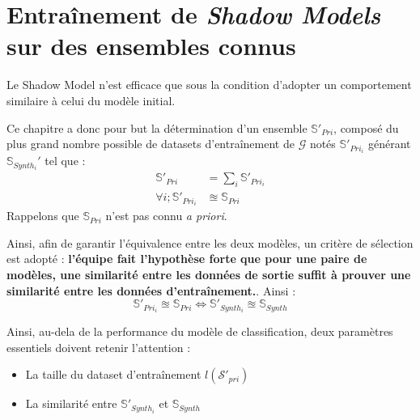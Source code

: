 \chapter{Entraînement de \textit{Shadow Models} sur des ensembles connus}\label{SM}
    Le Shadow Model n'est efficace que sous la condition d'adopter un comportement similaire à celui du modèle initial.

    Ce chapitre a donc pour but la détermination d'un ensemble $\mathbb{S}'_{Pri}$, composé du
    plus grand nombre possible de datasets d'entraînement de $\mathcal G$ notés $\mathbb{S}'_{Pri_i}$
    générant $\mathbb S_{Synth_i}'$ tel que :
                \begin{equation}\label{eq:Eq1}
                    \begin{split}
                        \mathbb{S}'_{Pri} &= \sum_i \mathbb{S}'_{Pri_i} \\
                        \forall i; \mathbb{S}'_{Pri_i} &\approxeq \mathbb{S}_{Pri}
                    \end{split}
                \end{equation}
    Rappelons que $\mathbb{S}_{Pri}$ n'est pas connu \textit{a priori}.

    Ainsi, afin de garantir l'équivalence entre les deux modèles, un critère de sélection est
    adopté :
    \textbf{l'équipe fait l'hypothèse forte que pour une paire de modèles, une similarité entre les données de sortie suffit à prouver une similarité entre les données d'entraînement.}. Ainsi :
        \begin{equation}\label{eq:Eq2}
            \mathbb{S}'_{Pri_i} \approxeq \mathbb{S}_{Pri} \Longleftrightarrow \mathbb{S}'_{Synth_i} \approxeq \mathbb{S}_{Synth}
        \end{equation}

    \begin{tcolorbox}[colback=linkborder_Color!5!white,colframe=linkborder_Color!75!black]
        Ainsi, au-dela de la performance du modèle de classification, deux paramètres essentiels
        doivent retenir l'attention :

        \begin{itemize}
            \item La taille du dataset d'entraînement $l\left(\mathcal S'_{pri}\right)$
            \item La similarité entre $\mathbb{S}'_{Synth_i}$ et $\mathbb{S}_{Synth}$
        \end{itemize}
    \end{tcolorbox}

